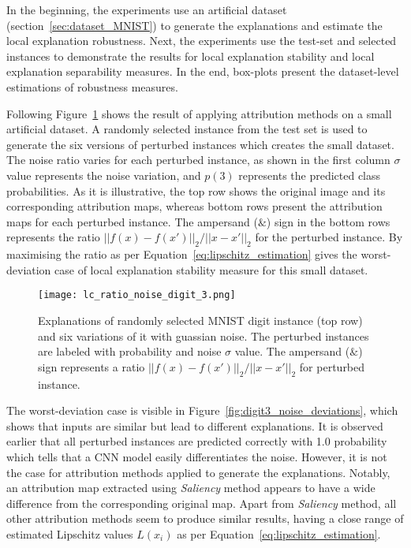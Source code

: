 \documentclass[english]{tktltiki2}
\theoremstyle{definition}
\theoremstyle{remark}
\begin{document}
In the beginning, the experiments use an artificial dataset (section~\ref{sec:dataset_MNIST}) to generate the explanations and estimate the local explanation robustness.  Next, the experiments use the test-set and selected instances to demonstrate the results for local explanation stability and local explanation separability measures. In the end, box-plots present the dataset-level estimations of robustness measures.

Following Figure~\ref{fig:digit3_noise_ratio} shows the result of applying attribution methods on a small artificial dataset. A randomly selected instance from the test set is used to generate the six versions of perturbed instances which creates the small dataset. The noise ratio varies for each perturbed instance, as shown in the first column $\sigma$ value represents the noise variation, and $p(3)$ represents the predicted class probabilities. As it is illustrative, the top row shows the original image and its corresponding attribution maps, whereas bottom rows present the attribution maps for each perturbed instance. The ampersand ($\&$) sign in the bottom rows represents the ratio $||f(x) - f(x\prime)||_2/||x - x\prime||_2$ for the perturbed instance. By maximising the ratio as per Equation~\eqref{eq:lipschitz_estimation} gives the worst-deviation case of local explanation stability measure for this small dataset.

\begin{figure}[H]
	\vspace*{0mm}
	\centering
	\texttt{[image: lc\_ratio\_noise\_digit\_3.png]}
	\caption{Explanations of randomly selected MNIST digit instance (top row) and six variations of it with guassian noise. The perturbed instances are labeled with probability and noise $\sigma$ value. The ampersand ($\&$) sign represents a ratio $||f(x) - f(x\prime)||_2/||x - x\prime||_2$ for perturbed instance.}%
	\label{fig:digit3_noise_ratio}%
\end{figure}

The worst-deviation case is visible in Figure~\ref{fig:digit3_noise_deviations}, which shows that inputs are similar but lead to different explanations. It is observed earlier that all perturbed instances are predicted correctly with 1.0 probability which tells that a CNN model easily differentiates the noise. However, it is not the case for attribution methods applied to generate the explanations. Notably, an attribution map extracted using \textit{Saliency} method appears to have a wide difference from the corresponding original map. Apart from \textit{Saliency} method, all other attribution methods seem to produce similar results, having a close range of estimated Lipschitz values $L(x_i)$ as per Equation~\eqref{eq:lipschitz_estimation}.
\end{document}
